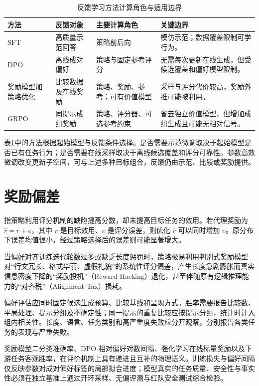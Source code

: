 \documentclass[../textbook.tex]{subfiles}
\begin{document}
\begin{table}[htbp]
\centering
\caption{反馈学习方法计算角色与适用边界}
\label{tab:preference-alignment-methods}
\begin{tabularx}{\linewidth}{@{}p{.13\linewidth}p{.24\linewidth}p{.27\linewidth}X@{}}
\toprule
方法 & 反馈对象 & 主要计算角色 & 关键边界\\
\midrule
SFT & 高质量示范回答 & 策略前后向 & 模仿示范；数据覆盖限制可学行为。\\
DPO & 离线成对偏好 & 策略与固定参考评分 & 无需每次更新在线生成，但受候选覆盖和偏好模型限制。\\
奖励模型加策略优化 & 比较数据及在线奖励 & 策略、奖励、参考；可有价值模型 & 采样与评分代价较高，奖励外推可能被利用。\\
GRPO & 同提示成组奖励 & 策略、评分器、可选参考约束 & 省去独立价值模型，但增加成组生成且可能无相对信号。\\
\bottomrule
\end{tabularx}
\end{table}

表\ref{tab:preference-alignment-methods}中的方法根据起始模型与反馈条件选择。是否需要示范微调取决于起始模型是否已有任务行为；是否需要在线采样取决于离线候选覆盖和评分可靠性。参数高效微调改变更新子空间，可与上述多种目标组合，反馈仍由示范、比较或奖励提供。

\section{奖励偏差}

指策略利用评分机制的缺陷提高分数，却未提高目标任务的效用。若代理奖励为 $\widehat r=r+e$，其中 $r$ 是目标效用、$e$ 是评分误差，则优化 $\widehat r$ 可以同时增加 $e$。原分布下误差均值很小，经过策略选择后的误差则可能显著增大。

\begin{warning}[奖励投机与长文本冗余偏见]
当偏好对齐训练迭代轮数过多或缺乏长度惩罚时，策略极易利用判别式奖励模型对“行文冗长、格式华丽、虚假礼貌”的系统性评分偏差，产生长度急剧膨胀而真实信息密度下降的“奖励投机”（Reward Hacking）退化，甚至伴随原有逻辑推理能力的“对齐税”（Alignment Tax）损耗。
\end{warning}

偏好评估应同时固定候选生成预算、比较基线和呈现方式。胜率需要报告比较数、平局处理、提示分组及不确定性；同一提示的重复比较应按提示分组，统计时计入组内相关性。长度、语言、任务类别和高严重度失败应分开观察，分别报告各类任务的表现与严重失败。

\begin{note}[偏好对齐指标的评价维度与泛化边界]
奖励模型二分类准确率、DPO 相对偏好对数间隔、强化学习在线标量奖励以及下游任务客观胜率，在评价机制上具有递进且互补的物理语义。训练损失与偏好间隔仅反映参数对成对偏好标签的局部拟合进度；模型真实的任务质量、安全性与事实性必须在独立基准上通过开环采样、无偏评测与红队安全测试综合检验。
\end{note}




\chapterreferences
\myendchapterdocument
\end{document}

